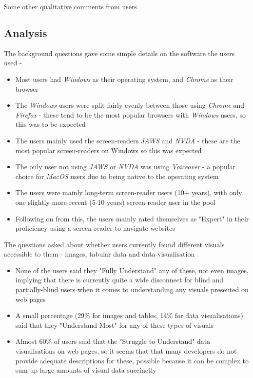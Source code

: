 \documentclass[ %
                    author={Aleena Baig},
                supervisor={Dr Simon Lock},
                    degree={BSc},
                     title={On Making Web Accessible Graphs},
                  subtitle={},
                      year={2019} ]{dissertation}
\begin{document}
Some other qualitative comments from users


\subsection{Analysis}

The background questions gave some simple details on the software the users used -

\begin{itemize}
    \item Most users had \textit{Windows} as their operating system, and \textit{Chrome} as their browser
    \item The \textit{Windows} users were split fairly evenly between those using \textit{Chrome} and \textit{Firefox} - these tend to be the most popular browsers with \textit{Windows} users, so this was to be expected
    \item The users mainly used the screen-readers \textit{JAWS} and \textit{NVDA} - these are the most popular screen-readers on Windows so this was expected
    \item The only user not using \textit{JAWS} or \textit{NVDA} was using \textit{Voiceover} - a popular choice for \textit{MacOS} users due to being native to the operating system
    \item The users were mainly long-term screen-reader users (10+ years), with only one slightly more recent (5-10 years) screen-reader user in the pool
    \item Following on from this, the users mainly rated themselves as "Expert" in their proficiency using a screen-reader to navigate websites
\end{itemize}

The questions asked about whether users currently found different visuals accessible to them - images, tabular data and data visualisation

\begin{itemize}
    \item None of the users said they "Fully Understand" any of these, not even images, implying that there is currently quite a wide disconnect for blind and partially-blind users when it comes to understanding any visuals presented on web pages
    \item A small percentage (29\% for images and tables, 14\% for data visualisations) said that they "Understand Most" for any of these types of visuals
    \item Almost 60\% of users said that the "Struggle to Understand" data visualisations on web pages, so it seems that that many developers do not provide adequate descriptions for these, possible because it can be complex to sum up large amounts of visual data succinctly
\end{itemize}
\end{document}
